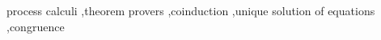 \documentclass[3p,preprint]{elsarticle}
\begin{document}
\begin{frontmatter}
\begin{abstract}
\end{abstract}

\begin{keyword}
process calculi \sep theorem provers \sep coinduction \sep unique
solution of equations \sep congruence
\end{keyword}

\end{frontmatter}

\linenumbers




















\end{document}
